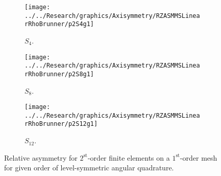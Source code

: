 \documentclass[12pt]{article}
\begin{document}
\begin{sidewaysfigure}[!htb]
\centering
\begin{subfigure}{0.33\textwidth}
\texttt{[image: ../../Research/graphics/Axisymmetry/RZASMMSLinearRhoBrunner/p2S4g1]}
\caption{$S_4$.}
\end{subfigure}%
\begin{subfigure}{0.33\textwidth}
\texttt{[image: ../../Research/graphics/Axisymmetry/RZASMMSLinearRhoBrunner/p2S8g1]}
\caption{$S_8$.}
\end{subfigure}%
\begin{subfigure}{0.33\textwidth}
\texttt{[image: ../../Research/graphics/Axisymmetry/RZASMMSLinearRhoBrunner/p2S12g1]}
\caption{$S_{12}$.}
\end{subfigure}
\caption{Relative asymmetry for $2^\text{st}$-order finite elements on a $1^\text{st}$-order mesh for given order of level-symmetric angular quadrature.}
\label{fig:RZASMMSLinearRhoBrunnerp2g1}
\end{sidewaysfigure}
\end{document}
